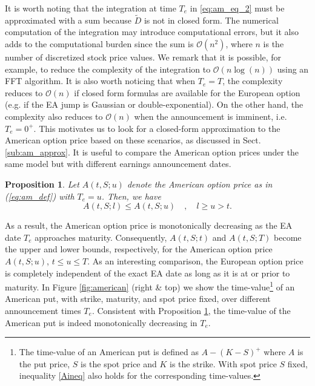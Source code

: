 \documentclass[11pt]{article}
\newtheorem{prop}[theorem]{Proposition}
\numberwithin{equation}{section}
\numberwithin{theorem}{section}
\begin{document}
 It is worth noting  that the integration at time $T_{e}$ in \eqref{eq:am_eq_2} 
must be approximated with a sum because $\tilde{D}$ is not in 
 closed form. The numerical computation of the integration may  introduce computational errors, but it also adds to the computational
burden since  the sum is $\mathcal{O}\left(n^{2}\right)$, where $n$
is the number of discretized  stock price values. We remark that
it is possible, for example, to reduce the complexity of the integration
to $\mathcal{O}\left(n{\log}\left(n\right)\right)$  using an  FFT algorithm. It is also worth noticing that when
$T_{e}=T$, the complexity reduces to $\mathcal{O}\left(n\right)$
if closed form formulas are available for the European option (e.g.
if the EA jump is Gaussian or double-exponential). On the other hand, the complexity also
reduces to $\mathcal{O}\left(n\right)$ when the announcement is imminent, i.e. $T_{e}=0^{+}$. This motivates us to look for a closed-form approximation to  the American option price based on these scenarios, as discussed in Sect. \ref{sub:am_approx}. It is useful 
to compare the American option prices under the same model but with
different earnings announcement dates.  
\begin{prop}
\label{prop:american_bounds}Let $A\left(t,S;u\right)$ denote the American option price as in (\ref{eq:am_def}) with $T_{e}=u$. Then, we have
\begin{equation}
\label{Aineq}
A\left(t,S;l\right)\leq A\left(t,S;u\right)\quad,\quad l\geq u>t.
\end{equation}
\end{prop}
As a result,  the American option price is monotonically decreasing as the EA date $T_{e}$ approaches maturity. Consequently, $A\left(t,S;t\right)$ and $A\left(t,S;T\right)$ become the upper and lower bounds, respectively, for the American option price $A\left(t,S;u\right)$, $t\leq u\leq T$. As an interesting comparison, the European option price is completely independent of  the exact EA date as long as it is at or prior to maturity. In Figure \ref{fig:american} (right \&  top) we show the time-value\footnote{The time-value of an American  put is defined as $A-(K-S)^+$ where $A$ is the put price, $S$ is the spot price and $K$ is the strike. With spot price $S$ fixed, inequality \eqref{Aineq} also holds for the corresponding time-values.} of an American put, with strike, maturity, and spot price fixed, over different announcement times $T_{e}$.  Consistent with  Proposition \ref{prop:american_bounds},
the time-value of the American put  is indeed monotonically decreasing
in $T_{e}$.
\end{document}
